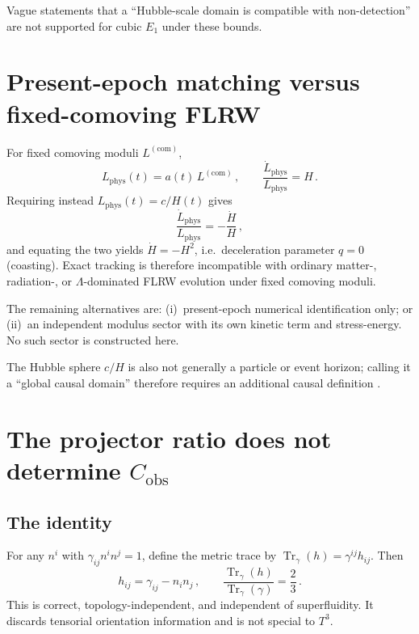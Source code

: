 \documentclass[aps,prd,reprint,superscriptaddress,nofootinbib,floatfix,showkeys]{revtex4-2}
\newcommand{\Tthree}{T^{3}}
\newcommand{\Cobs}{C_{\mathrm{obs}}}
\begin{document}
Vague statements that a ``Hubble-scale domain is compatible with non-detection''
are not supported for cubic \(E_1\) under these bounds.

\section{Present-epoch matching versus fixed-comoving FLRW}
\label{sec:dynamic}

For fixed comoving moduli \(L^{\mathrm{(com)}}\),
\begin{equation}
  L_{\mathrm{phys}}(t)=a(t)\,L^{\mathrm{(com)}}\,,
  \qquad
  \frac{\dot L_{\mathrm{phys}}}{L_{\mathrm{phys}}}=H\,.
  \label{eq:fixed}
\end{equation}
Requiring instead \(L_{\mathrm{phys}}(t)=c/H(t)\) gives
\begin{equation}
  \frac{\dot L_{\mathrm{phys}}}{L_{\mathrm{phys}}}
  = -\frac{\dot H}{H}\,,
  \label{eq:dsm-rate}
\end{equation}
and equating the two yields \(\dot H=-H^{2}\), i.e.\ deceleration parameter
\(q=0\) (coasting).  Exact tracking is therefore incompatible with ordinary
matter-, radiation-, or \(\Lambda\)-dominated FLRW evolution under fixed
comoving moduli.

The remaining alternatives are: (i)~present-epoch numerical identification
only; or (ii)~an independent modulus sector with its own kinetic term and
stress-energy.  No such sector is constructed here.

The Hubble sphere \(c/H\) is also not generally a particle or event horizon;
calling it a ``global causal domain'' therefore requires an additional causal
definition \cite{davis_lineweaver_horizon}.

\section{The projector ratio does not determine
\texorpdfstring{\(\Cobs\)}{C\_obs}}
\label{sec:proj}

\subsection{The identity}

For any \(n^{i}\) with \(\gamma_{ij}n^i n^j=1\), define the metric
trace by \(\operatorname{Tr}_{\gamma}(h)=\gamma^{ij}h_{ij}\). Then
\begin{equation}
  h_{ij}=\gamma_{ij}-n_{i}n_{j}\,,
  \qquad
  \frac{\operatorname{Tr}_{\gamma}(h)}{\operatorname{Tr}_{\gamma}(\gamma)}
  =\frac{2}{3}\,.
  \label{eq:trace}
\end{equation}
This is correct, topology-independent, and independent of superfluidity.  It
discards tensorial orientation information and is not special to \(\Tthree\).
\end{document}
